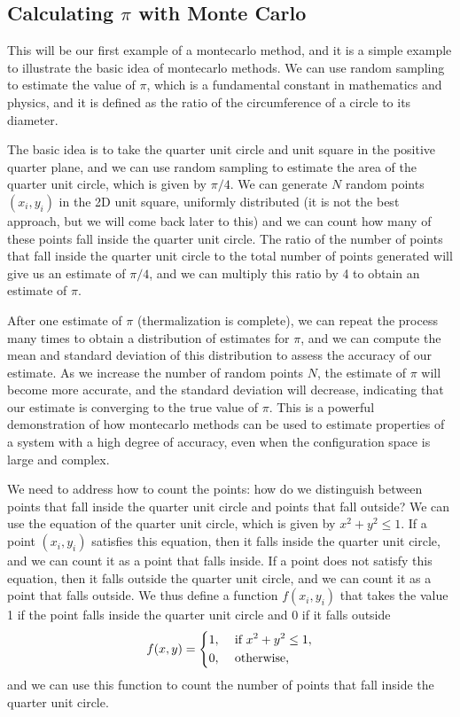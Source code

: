 \subsection{Calculating \(\pi\) with Monte Carlo}

This will be our first example of a montecarlo method, and it is a simple example to illustrate the basic idea of montecarlo methods. We can use random sampling to estimate the value of \(\pi\), which is a fundamental constant in mathematics and physics, and it is defined as the ratio of the circumference of a circle to its diameter.

The basic idea is to take the quarter unit circle and unit square in the positive quarter plane, and we can use random sampling to estimate the area of the quarter unit circle, which is given by \(\pi/4\). We can generate \(N\) random points \((x_i, y_i)\) in the 2D unit square, uniformly distributed (it is not the best approach, but we will come back later to this) and we can count how many of these points fall inside the quarter unit circle. The ratio of the number of points that fall inside the quarter unit circle to the total number of points generated will give us an estimate of \(\pi/4\), and we can multiply this ratio by 4 to obtain an estimate of \(\pi\).

After one estimate of \(\pi\) (thermalization is complete), we can repeat the process many times to obtain a distribution of estimates for \(\pi\), and we can compute the mean and standard deviation of this distribution to assess the accuracy of our estimate. As we increase the number of random points \(N\), the estimate of \(\pi\) will become more accurate, and the standard deviation will decrease, indicating that our estimate is converging to the true value of \(\pi\). This is a powerful demonstration of how montecarlo methods can be used to estimate properties of a system with a high degree of accuracy, even when the configuration space is large and complex.

We need to address how to count the points: how do we distinguish between points that fall inside the quarter unit circle and points that fall outside? We can use the equation of the quarter unit circle, which is given by \(x^2 + y^2 \leq 1\). If a point \((x_i, y_i)\) satisfies this equation, then it falls inside the quarter unit circle, and we can count it as a point that falls inside. If a point does not satisfy this equation, then it falls outside the quarter unit circle, and we can count it as a point that falls outside. We thus define a function \(f(x_i, y_i)\) that takes the value 1 if the point falls inside the quarter unit circle and 0 if it falls outside
\[
    f(x,y) = \begin{dcases}
        1, & \text{ if } x^2 + y^2 \leq 1, \\
        0, & \text{ otherwise},
    \end{dcases}
\]
and we can use this function to count the number of points that fall inside the quarter unit circle.

